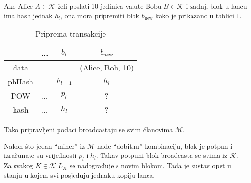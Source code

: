 \documentclass[12pt]{scrartcl} %
\newcommand{\tt}[1]{
\text{#1}
}
\newcommand{\red}[1]{
\color{red} #1 \color{black}
}
\newcommand{\korisnici}{\mathcal{K}}
\newcommand{\miners}{\mathcal{M}}
\begin{document}
\begin{primjer}
Ako Alice $A \in \korisnici$ želi poslati 10 jedinica valute Bobu $B \in \korisnici$ i zadnji blok u lancu ima hash jednak $h_l$, ona mora pripremiti blok $b_\tt{new}$ kako je prikazano u tablici \ref{tab:e4}.
\begin{table}[ht]
    \centering
    \begin{tabular}{|c|c|c|c|}
        \hline
        & ... & $b_l$ & $b_\tt{new}$ \\
        \hline
        data & ... & ... & (Alice, Bob, 10) \\
        \hline 
        pbHash & ... & $h_{l-1}$ & $h_l$ \\
        \hline
        POW & ... & $p_l$ & \red{?} \\
        \hline
        hash & ... & $h_l$ & \red{?} \\
        \hline
    \end{tabular}
    \caption{Priprema transakcije}
    \label{tab:e4}
\end{table}
Tako pripravljeni podaci broadcastaju se svim članovima $\miners$. 
\FloatBarrier
\end{primjer}
Nakon što jedan \enquote{miner} iz $\miners$ nađe \enquote{dobitnu} kombinaciju, blok je potpun i izračunate su vrijednosti $p_l$ i $h_l$. Takav potpuni blok broadcasta se svima iz $\korisnici$. Za svakog $K \in \korisnici$ $L_K$ se nadograđuje s novim blokom. Tada je sustav opet u stanju u kojem svi posjeduju jednaku kopiju lanca. 
\end{document}
